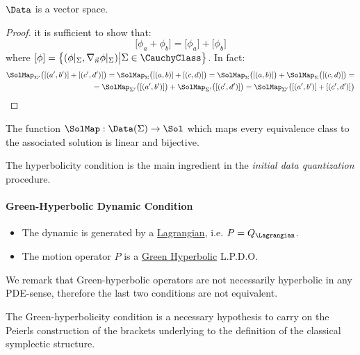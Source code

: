 \documentclass[Main]{subfiles}
\begin{document}
			\begin{proposition}
				$\Data$ is a vector space.
			\end{proposition}
			\begin{proof}
				it is sufficient to show that:
				\begin{displaymath}
					\big[ \phi_a + \phi_b \big] = \big[ \phi_a \big] + \big[ \phi_b \big]
				\end{displaymath}
				where $[\phi]= \big\{(\phi\vert_\Sigma , \nabla_{\vec{n}}\phi \vert_\Sigma) \big\vert \Sigma \in \CauchyClass \big\}$.
				In fact:
				\begin{align*}
					 \SolMap_{\Sigma'}\big([(a',b')] + [(c',d')] \big)=\SolMap_\Sigma\big([(a,b)] + [(c,d)] \big) = \SolMap_\Sigma\big([(a,b)] \big)+ \SolMap_\Sigma\big([(c,d)] \big) =\\
					 =\SolMap_{\Sigma'}\big([(a',b')] \big)+ \SolMap_{\Sigma'}\big([(c',d')] \big) = \SolMap_{\Sigma'}\big([(a',b')] +[(c',d')] \big)
				\end{align*}

			\end{proof}
			\begin{corollary}
				The function  $ 	 \SolMap : \Data (\Sigma ) \rightarrow \Sol $ which maps every equivalence class to the associated solution is linear and bijective.
			\end{corollary}
		\begin{observation}
			The hyperbolicity condition  is the main ingredient in the \emph{initial data quantization} procedure\cite{Wald1994}.	
		\end{observation}	
			
		\paragraph{Green-Hyperbolic Dynamic Condition}
		\begin{itemize}
			\item The dynamic is generated by a \underline{Lagrangian}, i.e.  $P= Q_\Lagrangian$.
			\item The motion operator $P$ is a \underline{Green Hyperbolic} L.P.D.O.
		\end{itemize}
		We remark that Green-hyperbolic operators are not necessarily hyperbolic in any PDE-sense, therefore the last two conditions are not equivalent.
		\begin{observation}
			The Green-hyperbolicity condition is a necessary hypothesis to carry on the Peierls construction of the brackets underlying to the definition of the classical symplectic structure.
		\end{observation}	
			 
\end{document}
